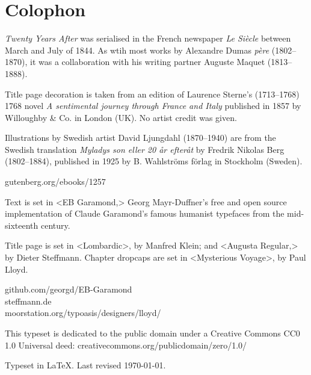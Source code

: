 \documentclass[
a5paper,
]{scrbook}
\begin{document}
\chapter*{Colophon}

\centering

\vfill
\begin{minipage}{\textwidth}
\textit{Twenty Years After} was serialised in the French newspaper \textit{Le Siècle} between March and July of 1844.  As wtih most works by Alexandre Dumas \textit{père} (1802--1870), it was a collaboration with his writing partner Auguste Maquet (1813--1888).

Title page decoration is taken from an edition of Laurence Sterne's (1713--1768) 1768 novel \textit{A sentimental journey through France and Italy} published in 1857 by Willoughby \& Co. in London (UK). No artist credit was given.

Illustrations by Swedish artist David Ljungdahl (1870--1940) are from the Swedish translation \textit{	
Myladys son eller 20 år efteråt} by Fredrik Nikolas Berg (1802--1884), published in 1925 by B. Wahlströms förlag in Stockholm (Sweden).
\end{minipage}
\vfill
gutenberg.org/ebooks/1257
\vfill
\divider
\vfill
\begin{minipage}{\textwidth}
Text is set in <EB Garamond,> Georg Mayr-Duffner's free and open source implementation of Claude Garamond’s famous humanist typefaces from the mid-sixteenth century.

Title page is set in <Lombardic>, by Manfred Klein; and <Augusta Regular,> by Dieter Steffmann. Chapter dropcaps are set in <Mysterious Voyage>, by Paul Lloyd.
\end{minipage}
\vfill
github.com/georgd/EB-Garamond\\steffmann.de\\moorstation.org/typoasis/designers/lloyd/
\vfill
\divider
\vfill
\begin{minipage}{\textwidth}
This typeset is dedicated to the public domain under a Creative Commons CC0 1.0 Universal deed: creativecommons.org/publicdomain/zero/1.0/\\
\end{minipage}
\vfill
\divider
\vfill
Typeset in \LaTeX{}. Last revised \today.
\thispagestyle{empty}
\end{document}
